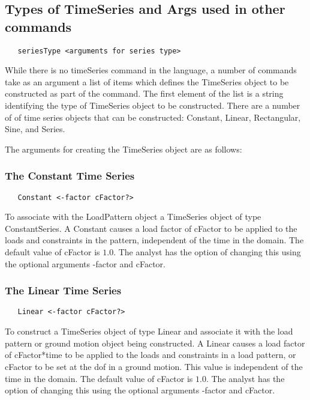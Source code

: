 \documentclass[12pt]{article}
\begin{document}
\subsection{Types of TimeSeries and Args used in other commands}

{\sf\small
\begin{verbatim}
   seriesType <arguments for series type>
\end{verbatim}
}


While there is no timeSeries command in the language, a number of
commands take as an argument a list of items which defines 
the TimeSeries object to be constructed as part of the command. The
first element of the list is a string identifying the type of
TimeSeries object to be constructed. There are a number of of
time series objects that can be constructed: 
Constant, Linear, Rectangular, Sine, and Series. 

The arguments for creating the TimeSeries object are as
follows: 

\subsubsection{The Constant Time Series}

{\sf\small
\begin{verbatim}
   Constant <-factor cFactor?> 
\end{verbatim}
}

\noindent To associate with the LoadPattern object a TimeSeries object
of type ConstantSeries. A Constant causes a load factor of cFactor to
be applied to the loads and constraints in the pattern, independent of
the time in the domain. The default value of cFactor is $1.0$. The
analyst has the option of changing this using the optional arguments
-factor and cFactor. 

\subsubsection{The Linear Time Series}

{\sf\small
\begin{verbatim}
   Linear <-factor cFactor?> 
\end{verbatim}
}

   
\noindent  To construct a TimeSeries object of type Linear and associate it with the load pattern or ground motion object being constructed. A Linear causes a load factor of cFactor*time to be applied to the loads and constraints in a load pattern, or cFactor to be set at the dof in a ground motion. This value is independent of the time in the domain. The default value of cFactor is $1.0$. The analyst has the option of changing this using the optional arguments
-factor and cFactor. 
\end{document}
